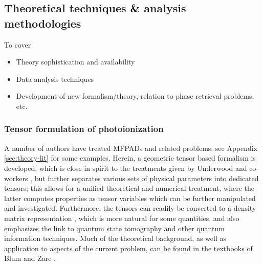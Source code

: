 \subsection{Theoretical techniques \& analysis methodologies}

To cover 

\begin{itemize}
\item Theory sophistication and availability
\item Data analysis techniques
\item Development of new formalism/theory, relation to phase retrieval problems, etc.
\end{itemize}

\subsubsection{Tensor formulation of photoionization}

A number of authors have treated MFPADs and related problems, see Appendix \ref{sec:theory-lit} for some examples. Herein, a geometric tensor based formalism is developed, which is close in spirit to the treatments given by Underwood and co-workers \cite{Reid2000, Stolow2008, Underwood2000}, but further separates various sets of physical parameters into dedicated tensors; this allows for a unified theoretical and numerical treatment, where the latter computes properties as tensor variables which can be further manipulated and investigated.%
Furthermore, the tensors can readily be converted to a density matrix representation \cite{BlumDensityMat, zareAngMom}, which is more natural for some quantities, and also emphasizes the link to quantum state tomography and other quantum information techniques. Much of the theoretical background, as well as application to aspects of the current problem, can be found in the textbooks of Blum \cite{BlumDensityMat} and Zare \cite{zareAngMom}.

